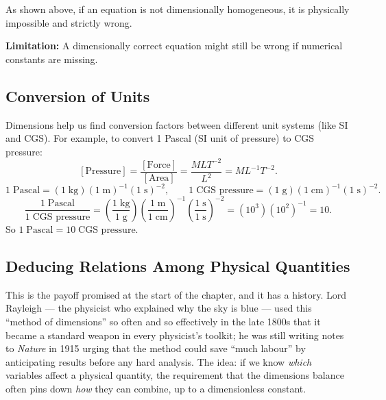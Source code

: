 As shown above, if an equation is not dimensionally homogeneous, it is physically impossible
and strictly wrong.

\textbf{Limitation:} A dimensionally correct equation might still be wrong if numerical constants
are missing.

\subsection{Conversion of Units}

Dimensions help us find conversion factors between different unit systems (like SI and CGS).
For example, to convert 1 Pascal (SI unit of pressure) to CGS pressure:
\[
  [\text{Pressure}] = \frac{[\text{Force}]}{[\text{Area}]} = \frac{MLT^{-2}}{L^2} = ML^{-1}T^{-2}.
\]
\[
  1\;\text{Pascal} = (1\;\text{kg})(1\;\text{m})^{-1}(1\;\text{s})^{-2}, \qquad
  1\;\text{CGS pressure} = (1\;\text{g})(1\;\text{cm})^{-1}(1\;\text{s})^{-2}.
\]
\[
  \frac{1\;\text{Pascal}}{1\;\text{CGS pressure}}
  = \left(\frac{1\;\text{kg}}{1\;\text{g}}\right)
    \left(\frac{1\;\text{m}}{1\;\text{cm}}\right)^{-1}
    \left(\frac{1\;\text{s}}{1\;\text{s}}\right)^{-2}
  = (10^3)(10^2)^{-1} = 10.
\]
So $1\;\text{Pascal} = 10\;\text{CGS pressure}$.

\subsection{Deducing Relations Among Physical Quantities}

This is the payoff promised at the start of the chapter, and it has a
history. Lord Rayleigh --- the physicist who explained why the sky is blue ---
used this ``method of dimensions'' so often and so effectively in the late
1800s that it became a standard weapon in every physicist's toolkit; he was
still writing notes to \emph{Nature} in 1915 urging that the method could
save ``much labour'' by anticipating results before any hard analysis. The
idea: if we know \emph{which} variables affect a physical quantity, the
requirement that the dimensions balance often pins down \emph{how} they can
combine, up to a dimensionless constant.

